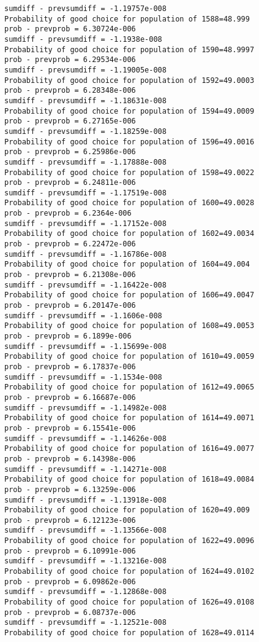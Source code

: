 \documentclass[11pt,onecolumn]{article}
\begin{document}
\begin{verbatim}
sumdiff - prevsumdiff = -1.19757e-008
Probability of good choice for population of 1588=48.999
prob - prevprob = 6.30724e-006
sumdiff - prevsumdiff = -1.1938e-008
Probability of good choice for population of 1590=48.9997
prob - prevprob = 6.29534e-006
sumdiff - prevsumdiff = -1.19005e-008
Probability of good choice for population of 1592=49.0003
prob - prevprob = 6.28348e-006
sumdiff - prevsumdiff = -1.18631e-008
Probability of good choice for population of 1594=49.0009
prob - prevprob = 6.27165e-006
sumdiff - prevsumdiff = -1.18259e-008
Probability of good choice for population of 1596=49.0016
prob - prevprob = 6.25986e-006
sumdiff - prevsumdiff = -1.17888e-008
Probability of good choice for population of 1598=49.0022
prob - prevprob = 6.24811e-006
sumdiff - prevsumdiff = -1.17519e-008
Probability of good choice for population of 1600=49.0028
prob - prevprob = 6.2364e-006
sumdiff - prevsumdiff = -1.17152e-008
Probability of good choice for population of 1602=49.0034
prob - prevprob = 6.22472e-006
sumdiff - prevsumdiff = -1.16786e-008
Probability of good choice for population of 1604=49.004
prob - prevprob = 6.21308e-006
sumdiff - prevsumdiff = -1.16422e-008
Probability of good choice for population of 1606=49.0047
prob - prevprob = 6.20147e-006
sumdiff - prevsumdiff = -1.1606e-008
Probability of good choice for population of 1608=49.0053
prob - prevprob = 6.1899e-006
sumdiff - prevsumdiff = -1.15699e-008
Probability of good choice for population of 1610=49.0059
prob - prevprob = 6.17837e-006
sumdiff - prevsumdiff = -1.1534e-008
Probability of good choice for population of 1612=49.0065
prob - prevprob = 6.16687e-006
sumdiff - prevsumdiff = -1.14982e-008
Probability of good choice for population of 1614=49.0071
prob - prevprob = 6.15541e-006
sumdiff - prevsumdiff = -1.14626e-008
Probability of good choice for population of 1616=49.0077
prob - prevprob = 6.14398e-006
sumdiff - prevsumdiff = -1.14271e-008
Probability of good choice for population of 1618=49.0084
prob - prevprob = 6.13259e-006
sumdiff - prevsumdiff = -1.13918e-008
Probability of good choice for population of 1620=49.009
prob - prevprob = 6.12123e-006
sumdiff - prevsumdiff = -1.13566e-008
Probability of good choice for population of 1622=49.0096
prob - prevprob = 6.10991e-006
sumdiff - prevsumdiff = -1.13216e-008
Probability of good choice for population of 1624=49.0102
prob - prevprob = 6.09862e-006
sumdiff - prevsumdiff = -1.12868e-008
Probability of good choice for population of 1626=49.0108
prob - prevprob = 6.08737e-006
sumdiff - prevsumdiff = -1.12521e-008
Probability of good choice for population of 1628=49.0114

\end{verbatim}
\end{document}
